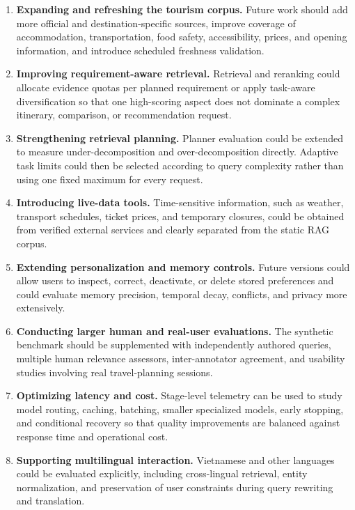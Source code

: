 \begin{enumerate}[label=(\roman*)]
    \item \textbf{Expanding and refreshing the tourism corpus.} Future work
    should add more official and destination-specific sources, improve coverage
    of accommodation, transportation, food safety, accessibility, prices, and
    opening information, and introduce scheduled freshness validation.

    \item \textbf{Improving requirement-aware retrieval.} Retrieval and
    reranking could allocate evidence quotas per planned requirement or apply
    task-aware diversification so that one high-scoring aspect does not dominate
    a complex itinerary, comparison, or recommendation request.

    \item \textbf{Strengthening retrieval planning.} Planner evaluation could
    be extended to measure under-decomposition and over-decomposition directly.
    Adaptive task limits could then be selected according to query complexity
    rather than using one fixed maximum for every request.

    \item \textbf{Introducing live-data tools.} Time-sensitive information,
    such as weather, transport schedules, ticket prices, and temporary closures,
    could be obtained from verified external services and clearly separated
    from the static RAG corpus.

    \item \textbf{Extending personalization and memory controls.} Future
    versions could allow users to inspect, correct, deactivate, or delete stored
    preferences and could evaluate memory precision, temporal decay, conflicts,
    and privacy more extensively.

    \item \textbf{Conducting larger human and real-user evaluations.} The
    synthetic benchmark should be supplemented with independently authored
    queries, multiple human relevance assessors, inter-annotator agreement, and
    usability studies involving real travel-planning sessions.

    \item \textbf{Optimizing latency and cost.} Stage-level telemetry can be
    used to study model routing, caching, batching, smaller specialized models,
    early stopping, and conditional recovery so that quality improvements are
    balanced against response time and operational cost.

    \item \textbf{Supporting multilingual interaction.} Vietnamese and other
    languages could be evaluated explicitly, including cross-lingual retrieval,
    entity normalization, and preservation of user constraints during query
    rewriting and translation.
\end{enumerate}

